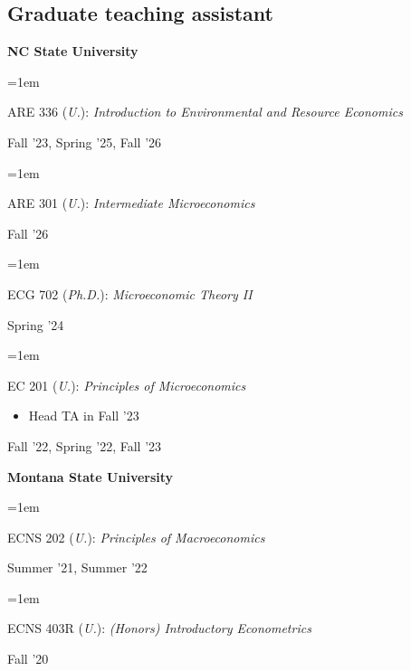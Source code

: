 \documentclass[12pt]{article}
\newenvironment{highlights}{
	\begin{itemize}[
		topsep=0.10 cm,
		partopsep=0pt,
		leftmargin=0.3 cm + 10pt,
		label={}
		]
	\setlength{\parsep}{0.10cm}\setlength{\itemsep}{0pt}
	}{
	\end{itemize}
}
\newenvironment{twocolentry}[2][]{%
	\par\noindent\def\secondColumn{#2}%
	\begin{minipage}[t]{\linewidth-5.1cm}\raggedright\hangindent=1em\hangafter=1\relax%
	}
	{%
		\end{minipage}\hfill%
		\begin{minipage}[t]{5cm}\raggedleft\secondColumn\end{minipage}\par\smallskip
	}
\newcommand{\Star}[1]{#1\textsuperscript{*}}
\begin{document}
\subsection{Graduate teaching assistant}

\vspace{0.1cm}

\textbf{NC State University}

\begin{twocolentry}
	{Fall '23, Spring '25, Fall '26}
	{ARE 336 (\emph{U.}): \emph{Introduction to Environmental and Resource Economics}}
\end{twocolentry}
\begin{twocolentry}
	{Fall '26}
	{ARE 301 (\emph{U.}): \emph{Intermediate Microeconomics}}
\end{twocolentry}
\begin{twocolentry}
	{Spring '24}
	{ECG 702 (\emph{Ph.D.}): \emph{Microeconomic Theory II}}
\end{twocolentry}
\begin{twocolentry}
	{Fall '22, Spring '22, Fall '23}
	{EC 201 (\emph{U.}): \emph{Principles of Microeconomics}}
	\begin{highlights}
		\item Head TA in Fall '23
	\end{highlights}
\end{twocolentry}

\vspace{0.1cm}

\textbf{Montana State University}
\begin{twocolentry}
	{Summer '21, Summer '22}
	{ECNS 202 (\emph{U.}): \emph{Principles of Macroeconomics}}
\end{twocolentry}
\begin{twocolentry}
	{Fall '20}
	{ECNS 403R (\emph{U.}): \emph{(Honors) Introductory Econometrics}}
\end{twocolentry}

\end{document}
